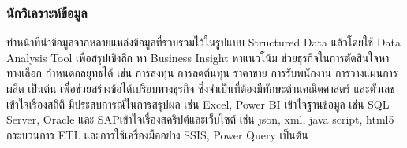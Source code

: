 \hspace{0cm}\subsubsection{นักวิเคราะห์ข้อมูล}ทำหน้าที่นำข้อมูลจากหลายแหล่งข้อมูลที่รวบรวมไว้ในรูปแบบ Structured Data แล้วโดยใช้ Data Analysis Tool เพื่อสรุปเชิงลึก หา Business Insight หาแนวโน้ม ช่วยธุรกิจในการตัดสินใจหาทางเลือก กำหนดกลยุทธได้ เช่น การลงทุน การลดต้นทุน ราคาขาย การรับพนักงาน การวางแผนการผลิต เป็นต้น เพื่อช่วยสร้างข้อได้เปรียบทางธุรกิจ ซึ่งจำเป็นที่ต้องมีทักษะด้านคณิตศาสตร์ และตัวเลข เข้าใจเรื่องสถิติ มีประสบการณ์ในการสรุปผล เช่น Excel, Power BI เข้าใจฐานข้อมูล เช่น SQL Server, Oracle และ SAPเข้าใจเรื่องสคริปต์และเว็บไซต์ เช่น json, xml, java script, html5 กระบวนการ ETL และการใช้เครื่องมืออย่าง SSIS, Power Query เป็นต้น \cite{job:5}